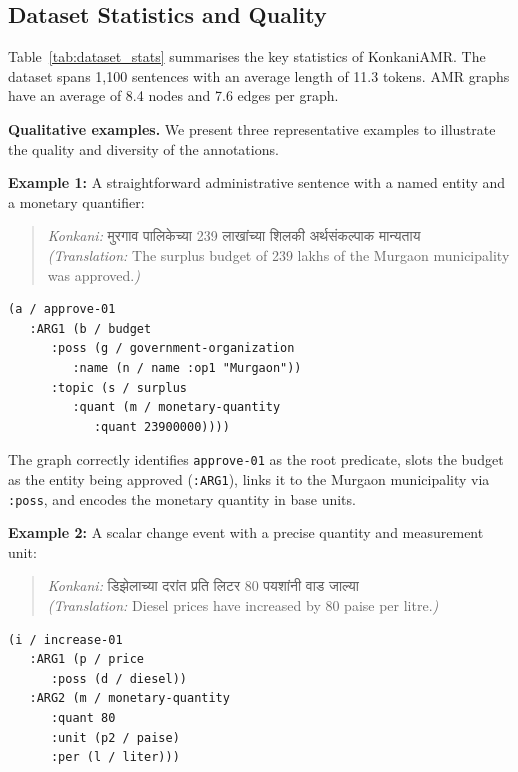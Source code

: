 \subsection{Dataset Statistics and Quality}



Table~\ref{tab:dataset_stats} summarises the key statistics of KonkaniAMR. The dataset spans 1,100 sentences with an average length of 11.3 tokens. AMR graphs have an average of 8.4 nodes and 7.6 edges per graph.

\textbf{Qualitative examples.} We present three representative examples to illustrate the quality and diversity of the annotations.

\textbf{Example 1:} A straightforward administrative sentence with a named entity and a monetary quantifier:

\begin{quote}
\textit{Konkani:} मुरगाव पालिकेच्या 239 लाखांच्या शिलकी अर्थसंकल्पाक मान्यताय \\
\textit{(Translation:} The surplus budget of 239 lakhs of the Murgaon municipality was approved.\textit{)}
\end{quote}

\begin{verbatim}
(a / approve-01
   :ARG1 (b / budget
      :poss (g / government-organization
         :name (n / name :op1 "Murgaon"))
      :topic (s / surplus
         :quant (m / monetary-quantity
            :quant 23900000))))
\end{verbatim}

The graph correctly identifies \texttt{approve-01} as the root predicate, slots the budget as the entity being approved (\texttt{:ARG1}), links it to the Murgaon municipality via \texttt{:poss}, and encodes the monetary quantity in base units.

\textbf{Example 2:} A scalar change event with a precise quantity and measurement unit:

\begin{quote}
\textit{Konkani:} डिझेलाच्या दरांत प्रति लिटर 80 पयशांनी वाड जाल्या \\
\textit{(Translation:} Diesel prices have increased by 80 paise per litre.\textit{)}
\end{quote}

\begin{verbatim}
(i / increase-01
   :ARG1 (p / price
      :poss (d / diesel))
   :ARG2 (m / monetary-quantity
      :quant 80
      :unit (p2 / paise)
      :per (l / liter)))
\end{verbatim}

